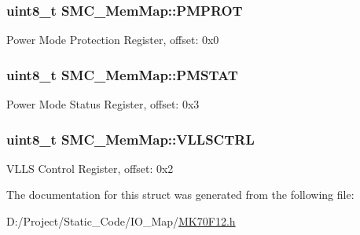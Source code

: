 \subsubsection[{P\+M\+P\+R\+O\+T}]{\setlength{\rightskip}{0pt plus 5cm}uint8\+\_\+t S\+M\+C\+\_\+\+Mem\+Map\+::\+P\+M\+P\+R\+O\+T}\label{struct_s_m_c___mem_map_afd03d93a7823dc65f53216dca15a2a95}
Power Mode Protection Register, offset\+: 0x0 \hypertarget{struct_s_m_c___mem_map_a0fddef87e229c4cf1b3be0d29589e964}{}
\subsubsection[{P\+M\+S\+T\+A\+T}]{\setlength{\rightskip}{0pt plus 5cm}uint8\+\_\+t S\+M\+C\+\_\+\+Mem\+Map\+::\+P\+M\+S\+T\+A\+T}\label{struct_s_m_c___mem_map_a0fddef87e229c4cf1b3be0d29589e964}
Power Mode Status Register, offset\+: 0x3 \hypertarget{struct_s_m_c___mem_map_ad5b37041739800b7bb7afc59d53c7ded}{}
\subsubsection[{V\+L\+L\+S\+C\+T\+R\+L}]{\setlength{\rightskip}{0pt plus 5cm}uint8\+\_\+t S\+M\+C\+\_\+\+Mem\+Map\+::\+V\+L\+L\+S\+C\+T\+R\+L}\label{struct_s_m_c___mem_map_ad5b37041739800b7bb7afc59d53c7ded}
V\+L\+L\+S Control Register, offset\+: 0x2 

The documentation for this struct was generated from the following file\+:\begin{DoxyCompactItemize}
\item 
D\+:/\+Project/\+Static\+\_\+\+Code/\+I\+O\+\_\+\+Map/\hyperlink{_m_k70_f12_8h}{M\+K70\+F12.\+h}\end{DoxyCompactItemize}
